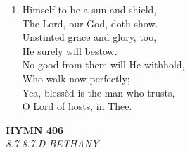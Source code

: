 \documentclass[11pt,a4paper]{article}
\begin{document}
\begin{enumerate}
    \item Himself to be a sun and shield, \\
        The Lord, our God, doth show. \\
        Unstinted grace and glory, too, \\
        He surely will bestow. \\
        No good from them will He withhold, \\
        Who walk now perfectly; \\
        Yea, bless\`ed is the man who trusts, \\
        O Lord of hosts, in Thee.

\end{enumerate}

\newpage
\begin{center}
    {\Large \textbf{HYMN 406}}
    \\
    \textit{8.7.8.7.D BETHANY}
\end{center}
\vspace{1em}
\end{document}
